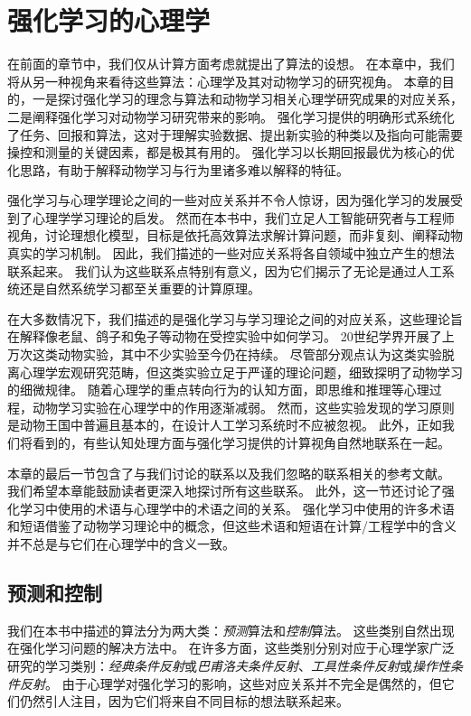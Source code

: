 

\chapter{强化学习的心理学} \label{chap:chap11}

在前面的章节中，我们仅从计算方面考虑就提出了算法的设想。
在本章中，我们将从另一种视角来看待这些算法：心理学及其对动物学习的研究视角。
本章的目的，一是探讨强化学习的理念与算法和动物学习相关心理学研究成果的对应关系，二是阐释强化学习对动物学习研究带来的影响。
强化学习提供的明确形式系统化了任务、回报和算法，这对于理解实验数据、提出新实验的种类以及指向可能需要操控和测量的关键因素，都是极其有用的。
强化学习以长期回报最优为核心的优化思路，有助于解释动物学习与行为里诸多难以解释的特征。


强化学习与心理学理论之间的一些对应关系并不令人惊讶，因为强化学习的发展受到了心理学学习理论的启发。
然而在本书中，我们立足人工智能研究者与工程师视角，讨论理想化模型，目标是依托高效算法求解计算问题，而非复刻、阐释动物真实的学习机制。
因此，我们描述的一些对应关系将各自领域中独立产生的想法联系起来。
我们认为这些联系点特别有意义，因为它们揭示了无论是通过人工系统还是自然系统学习都至关重要的计算原理。


在大多数情况下，我们描述的是强化学习与学习理论之间的对应关系，这些理论旨在解释像老鼠、鸽子和兔子等动物在受控实验中如何学习。
20世纪学界开展了上万次这类动物实验，其中不少实验至今仍在持续。
尽管部分观点认为这类实验脱离心理学宏观研究范畴，但这类实验立足于严谨的理论问题，细致探明了动物学习的细微规律。
随着心理学的重点转向行为的认知方面，即思维和推理等心理过程，动物学习实验在心理学中的作用逐渐减弱。
然而，这些实验发现的学习原则是动物王国中普遍且基本的，在设计人工学习系统时不应被忽视。
此外，正如我们将看到的，有些认知处理方面与强化学习提供的计算视角自然地联系在一起。


本章的最后一节包含了与我们讨论的联系以及我们忽略的联系相关的参考文献。
我们希望本章能鼓励读者更深入地探讨所有这些联系。
此外，这一节还讨论了强化学习中使用的术语与心理学中的术语之间的关系。
强化学习中使用的许多术语和短语借鉴了动物学习理论中的概念，但这些术语和短语在计算/工程学中的含义并不总是与它们在心理学中的含义一致。


\section{预测和控制}


我们在本书中描述的算法分为两大类：\textit{预测}算法和\textit{控制}算法。
这些类别自然出现在强化学习问题的解决方法中。
在许多方面，这些类别分别对应于心理学家广泛研究的学习类别：\textit{经典条件反射}或\textit{巴甫洛夫条件反射}、\textit{工具性条件反射}或\textit{操作性条件反射}。
由于心理学对强化学习的影响，这些对应关系并不完全是偶然的，但它们仍然引人注目，因为它们将来自不同目标的想法联系起来。


